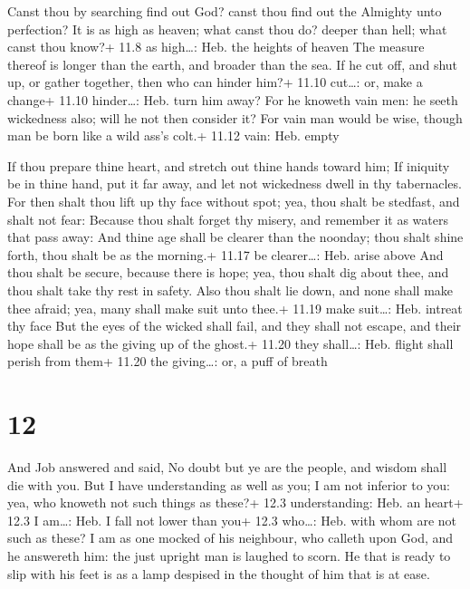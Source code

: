  Canst thou by searching find out God? canst thou find out
the Almighty unto perfection?  It is as high as heaven; what
canst thou do? deeper than hell; what canst thou know?+ 11.8 as
high\ldots: Heb. the heights of heaven  The measure thereof
is longer than the earth, and broader than the sea.  If he
cut off, and shut up, or gather together, then who can hinder him?+
11.10 cut\ldots: or, make a change+ 11.10 hinder\ldots: Heb. turn him
away?  For he knoweth vain men: he seeth wickedness also;
will he not then consider it?  For vain man would be wise,
though man be born like a wild ass's colt.+ 11.12 vain: Heb. empty

 If thou prepare thine heart, and stretch out thine hands
toward him;  If iniquity be in thine hand, put it far away,
and let not wickedness dwell in thy tabernacles.  For then
shalt thou lift up thy face without spot; yea, thou shalt be stedfast,
and shalt not fear:  Because thou shalt forget thy misery,
and remember it as waters that pass away:  And thine age
shall be clearer than the noonday; thou shalt shine forth, thou shalt be
as the morning.+ 11.17 be clearer\ldots: Heb. arise above 
And thou shalt be secure, because there is hope; yea, thou shalt dig
about thee, and thou shalt take thy rest in safety.  Also
thou shalt lie down, and none shall make thee afraid; yea, many shall
make suit unto thee.+ 11.19 make suit\ldots: Heb. intreat thy face
 But the eyes of the wicked shall fail, and they shall not
escape, and their hope shall be as the giving up of the ghost.+ 11.20
they shall\ldots: Heb. flight shall perish from them+ 11.20 the
giving\ldots: or, a puff of breath

\hypertarget{section-11}{%
\section{12}\label{section-11}}

 And Job answered and said,  No doubt but ye are
the people, and wisdom shall die with you.  But I have
understanding as well as you; I am not inferior to you: yea, who knoweth
not such things as these?+ 12.3 understanding: Heb. an heart+ 12.3 I
am\ldots: Heb. I fall not lower than you+ 12.3 who\ldots: Heb. with whom
are not such as these?  I am as one mocked of his neighbour,
who calleth upon God, and he answereth him: the just upright man is
laughed to scorn.  He that is ready to slip with his feet is
as a lamp despised in the thought of him that is at ease.

